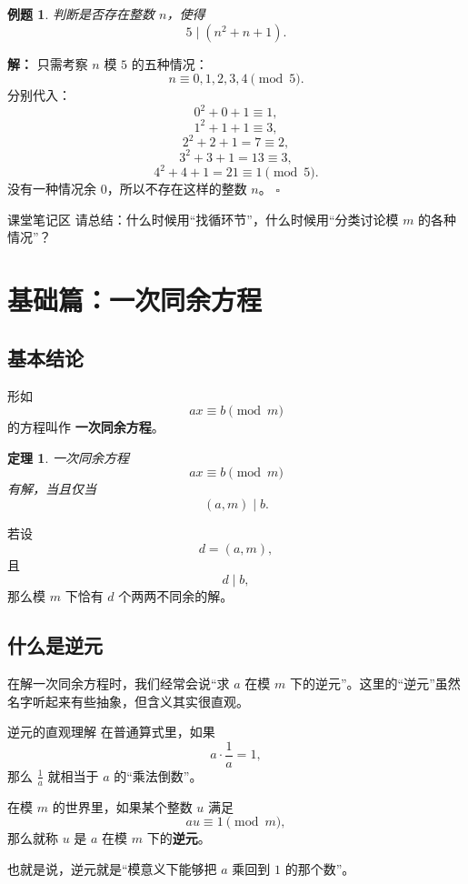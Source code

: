 \documentclass[11pt,a4paper,fontset=fandol]{ctexart}
\theoremstyle{formaltheorem}
\newtheorem{theorem}{定理}[section]
\theoremstyle{formalexample}
\newtheorem{example}{例题}[section]
\newenvironment{solution}{\par\noindent\textbf{解：}}{\hfill$\square$\par}
\newcommand{\classblank}{\vspace{2.2cm}}
\begin{document}
\begin{example}
判断是否存在整数 $n$，使得
\[
5\mid (n^2+n+1).
\]
\end{example}

\begin{solution}
只需考察 $n$ 模 $5$ 的五种情况：
\[
n\equiv 0,1,2,3,4\pmod 5.
\]
分别代入：
\[
0^2+0+1\equiv 1,
\]
\[
1^2+1+1\equiv 3,
\]
\[
2^2+2+1=7\equiv 2,
\]
\[
3^2+3+1=13\equiv 3,
\]
\[
4^2+4+1=21\equiv 1\pmod 5.
\]
没有一种情况余 $0$，所以不存在这样的整数 $n$。
\end{solution}

\begin{notebox}{课堂笔记区}
请总结：什么时候用“找循环节”，什么时候用“分类讨论模 $m$ 的各种情况”？
\classblank
\end{notebox}

\section{基础篇：一次同余方程}

\subsection{基本结论}

形如
\[
ax\equiv b\pmod m
\]
的方程叫作 \textbf{一次同余方程}。

\begin{theorem}
一次同余方程
\[
ax\equiv b\pmod m
\]
有解，当且仅当
\[
(a,m)\mid b.
\]
\end{theorem}

若设
\[
d=(a,m),
\]
且
\[
d\mid b,
\]
那么模 $m$ 下恰有 $d$ 个两两不同余的解。

\subsection{什么是逆元}

在解一次同余方程时，我们经常会说“求 $a$ 在模 $m$ 下的逆元”。这里的“逆元”虽然名字听起来有些抽象，但含义其实很直观。

\begin{goalbox}{逆元的直观理解}
在普通算式里，如果
\[
a\cdot \frac1a=1,
\]
那么 $\frac1a$ 就相当于 $a$ 的“乘法倒数”。

在模 $m$ 的世界里，如果某个整数 $u$ 满足
\[
au\equiv 1\pmod m,
\]
那么就称 $u$ 是 $a$ 在模 $m$ 下的\textbf{逆元}。
\end{goalbox}

也就是说，逆元就是“模意义下能够把 $a$ 乘回到 $1$ 的那个数”。
\end{document}
